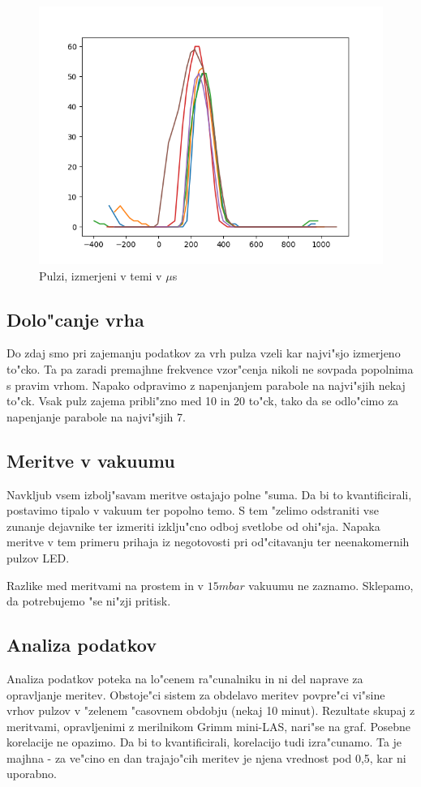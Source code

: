 \documentclass[11pt,a4paper]{article}
\begin{document}
\begin{figure}[H]
	\begin{center}
		\includegraphics[width=12cm]{dark.png}
		\caption{Pulzi, izmerjeni v temi v $\mu$s}
		\label{dark}
	\end{center}
\end{figure}

\subsection{Dolo"canje vrha}
Do zdaj smo pri zajemanju podatkov za vrh pulza vzeli kar najvi"sjo izmerjeno to"cko. Ta pa zaradi premajhne frekvence vzor"cenja nikoli ne sovpada popolnima s pravim vrhom. Napako odpravimo z napenjanjem parabole na najvi"sjih nekaj to"ck. Vsak pulz zajema pribli"zno med 10 in 20 to"ck, tako da se odlo"cimo za napenjanje parabole na najvi"sjih 7.

\subsection{Meritve v vakuumu}
Navkljub vsem izbolj"savam meritve ostajajo polne "suma. Da bi to kvantificirali, postavimo tipalo v vakuum ter popolno temo. S tem "zelimo odstraniti vse zunanje dejavnike ter izmeriti izklju"cno odboj svetlobe od ohi"sja. Napaka meritve v tem primeru prihaja iz negotovosti pri od"citavanju ter neenakomernih pulzov LED.

Razlike med meritvami na prostem in v $ 15mbar $ vakuumu ne zaznamo. Sklepamo, da potrebujemo "se ni"zji pritisk.

\subsection{Analiza podatkov}
Analiza podatkov poteka na lo"cenem ra"cunalniku in ni del naprave za opravljanje meritev. Obstoje"ci sistem za obdelavo meritev povpre"ci vi"sine vrhov pulzov v "zelenem "casovnem obdobju (nekaj 10 minut). Rezultate skupaj z meritvami, opravljenimi z merilnikom Grimm mini-LAS, nari"se na graf. Posebne korelacije ne opazimo. Da bi to kvantificirali, korelacijo tudi izra"cunamo. Ta je majhna - za ve"cino en dan trajajo"cih meritev je njena vrednost pod 0,5, kar ni uporabno.
\end{document}
